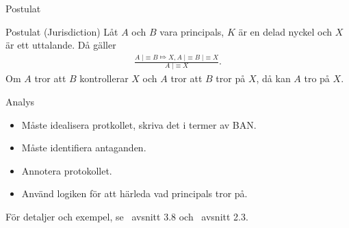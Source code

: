 \documentclass{beamer}
\theoremstyle{definition}
\newenvironment{axiom}[1]{\begin{block}{Postulat (#1)}}{\end{block}}
\theoremstyle{remark}
\DeclareMathOperator{\believes}{|\!\!\!\equiv}
\DeclareMathOperator{\controls}{\Mapsto}
\begin{document}
\begin{frame}{\insertsubsectionhead}{Postulat}
  \begin{axiom}{Jurisdiction}
    Låt \(A\) och \(B\) vara principals, \(K\) är en delad nyckel och \(X\) är 
    ett uttalande.
    Då gäller
    \begin{align*}
      \frac{A\believes B\controls X, A\believes B\believes X}%
        {A\believes X}.
    \end{align*}
    Om \(A\) tror att \(B\) kontrollerar \(X\) och \(A\) tror att \(B\) tror på 
    \(X\),
    då kan \(A\) tro på \(X\).
  \end{axiom}
\end{frame}

\begin{frame}{\insertsubsectionhead}{Analys}
  \begin{itemize}
    \item Måste idealisera protkollet, skriva det i termer av BAN\@.
    \item Måste identifiera antaganden.
    \item Annotera protokollet.
    \item Använd logiken för att härleda vad principals tror på.
  \end{itemize}
  För detaljer och exempel, se~\cite{Anderson2008sea} avsnitt 3.8 
  och~\cite{Syverson2001tlo} avsnitt 2.3.
\end{frame}
\end{document}
